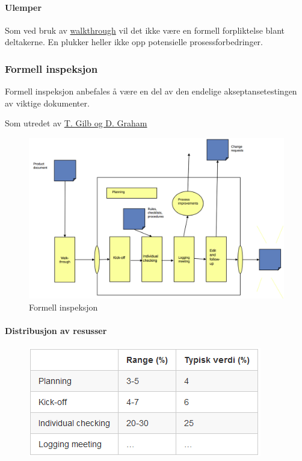 \paragraph{Ulemper}

Som ved bruk av \href{\#walkthrough}{walkthrough} vil det ikke være en
formell forpliktelse blant deltakerne. En plukker heller ikke opp
potensielle prosessforbedringer.

\subsubsection{Formell inspeksjon}

Formell inspeksjon anbefales å være en del av den endelige
akseptansetestingen av viktige dokumenter.

Som utredet av
\href{http://books.google.no/books?id=GO11btO0-vIC\&q=\%22software+inspection\%22\&dq=\%22software+inspection\%22\&hl=en\&sa=X\&ei=KNZ1T\_WcKeL64QSn99mbDw\&redir\_esc=y}{T.
Gilb og D. Graham}

\begin{figure}[htbp]
\centering
\includegraphics{Forelesning 05/img/2.png}
\caption{Formell inspeksjon}
\end{figure}

\paragraph{Distribusjon av resusser}

\begin{figure}[htbp]
\centering
\includegraphics{Forelesning 05/img/4.PNG}
\caption{}
\end{figure}

